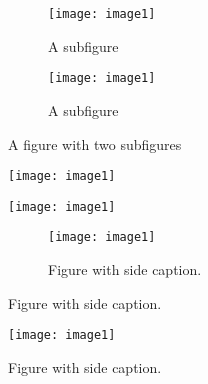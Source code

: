 \documentclass{article}
\begin{document}
    \begin{figure}
        \centering
        \begin{subfigure}{.5\textwidth}
            \centering
            \texttt{[image: image1]}
            \caption{A subfigure}
            \label{fig:sub1}
        \end{subfigure}%
        \begin{subfigure}{.5\textwidth}
            \centering
            \texttt{[image: image1]}
            \caption{A subfigure}
            \label{fig:sub2}
        \end{subfigure}
        \caption{A figure with two subfigures}
        \label{fig:test}
    \end{figure}

    \begin{figure}
        \centering
        \begin{minipage}{.5\textwidth}
            \centering
            \texttt{[image: image1]}
            \label{fig:test1}
        \end{minipage}%
        \begin{minipage}{.5\textwidth}
            \centering
            \texttt{[image: image1]}
            \label{fig:test2}
        \end{minipage}
    \end{figure}

    \begin{figure}
        \begin{subfigure}[c]{0.67\textwidth}
            \texttt{[image: image1]}
        \end{subfigure}\hfill
        \begin{subfigure}[c]{0.3\textwidth}
            \caption{Figure with side caption.} \label{fig:test3}
        \end{subfigure}
    \end{figure}

    \begin{figure}
        \begin{minipage}[c]{0.67\textwidth}
            \texttt{[image: image1]}
        \end{minipage}\hfill
        \begin{minipage}[c]{0.3\textwidth}
            \caption{Figure with side caption.} \label{fig:test4}
        \end{minipage}
    \end{figure}
\end{document}
